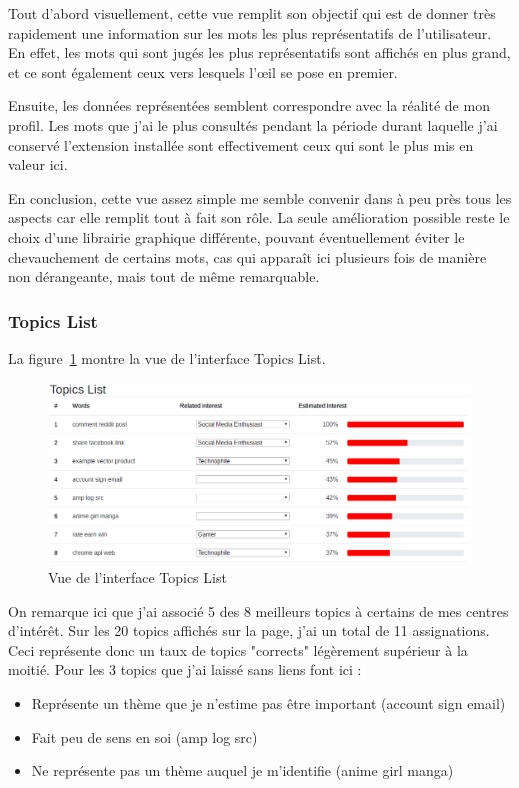 		Tout d'abord visuellement, cette vue remplit son objectif qui est de donner très rapidement une information sur les mots les plus représentatifs de l'utilisateur. En effet, les mots qui sont jugés les plus représentatifs sont affichés en plus grand, et ce sont également ceux vers lesquels l’œil se pose en premier.

		Ensuite, les données représentées semblent correspondre avec la réalité de mon profil. Les mots que j'ai le plus consultés pendant la période durant laquelle j'ai conservé l'extension installée sont effectivement ceux qui sont le plus mis en valeur ici.

		En conclusion, cette vue assez simple me semble convenir dans à peu près tous les aspects car elle remplit tout à fait son rôle. La seule amélioration possible reste le choix d'une librairie graphique différente, pouvant éventuellement éviter le chevauchement de certains mots, cas qui apparaît ici plusieurs fois de manière non dérangeante, mais tout de même remarquable.

\FloatBarrier

		\subsubsection{Topics List}

		La figure~\ref{critique-topics} montre la vue de l'interface Topics List.

		\begin{figure}[!h]
			\centering
			\includegraphics[width=1\textwidth]{images/results/critique-topics}
			\caption{Vue de l'interface Topics List}
			\label{critique-topics}
		\end{figure}

		On remarque ici que j'ai associé 5 des 8 meilleurs topics à certains de mes centres d'intérêt. Sur les 20 topics affichés sur la page, j'ai un total de 11 assignations. Ceci représente donc un taux de topics "corrects" légèrement supérieur à la moitié. Pour les 3 topics que j'ai laissé sans liens font ici :
		\begin{itemize}
			\item Représente un thème que je n'estime pas être important (account sign email)
			\item Fait peu de sens en soi (amp log src)
			\item Ne représente pas un thème auquel je m'identifie (anime girl manga)
		\end{itemize}

